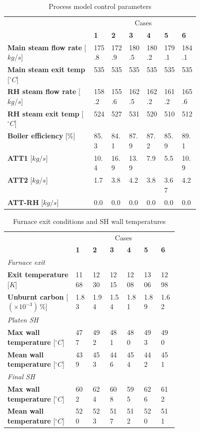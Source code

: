 \documentclass[review]{elsarticle}
\begin{document}
\begin{table}[h!]\label{tbl_process_parameters}
\centering
\caption{Process model control parameters}
\label{fuel}
{\tabulinesep=1.2mm
\begin{tabularx}{\linewidth}{p{0.45\linewidth} XXXXXX}
\hline
&\multicolumn{6}{c}{Cases}\\
 & \textbf{1} & \textbf{2} & \textbf{3}& \textbf{4}&\textbf{5}&\textbf{6}\\
\hline
\textbf{Main steam flow rate} 	[$kg/s$]		&175.8&172.9&180.5&180.2&179.1&184.1 \\
\textbf{Main steam exit temp} 	[$^{\circ}C$]	&535& 535 &535&535 &535& 535\\
\textbf{RH steam flow rate} 	[$kg/s$]		&158.2&155.6&162.5&162.2&161.2&165.6\\
\textbf{RH steam exit temp} 	[$^{\circ}C$]	&524&527&531&520&510&512\\
\textbf{Boiler efficiency} 		[$\%$]			&85.3&84.1&87.9	&87.2&85.9&89.1\\
\textbf{ATT1} 		[$kg/s$]					&10.4&16.9&13.9&7.9&5.5&10.9\\
\textbf{ATT2} 		[$kg/s$]					&1.7&3.8&4.2&3.8&3.67&4.2\\
\textbf{ATT-RH} 		[$kg/s$]				&0.0&0.0&0.0&0.0&0.0&0.0\\
\hline
\end{tabularx}}
\end{table}

\begin{table}[h!]\label{tbl_cfd_results}
\centering
\caption{Furnace exit conditions and SH wall temperatures}
\label{fuel}
{\tabulinesep=1.2mm
\begin{tabularx}{\linewidth}{p{0.4\linewidth} XXXXXX}
\hline
&\multicolumn{6}{c}{Cases}\\
 & \textbf{1} & \textbf{2} & \textbf{3}& \textbf{4}&\textbf{5}&\textbf{6}\\
\hline
\multicolumn{7}{l}{\textit{Furnace exit}}\\
\textbf{Exit temperature} [$K$] & 1168 & 1230 & 1215 & 1208 & 1306 & 1298\\
\textbf{Unburnt carbon} [$(\times 10^{-3})\,\%$] & 1.83 & 1.94 & 1.54 & 1.81 & 1.89 & 1.62\\
\multicolumn{7}{l}{\textit{Platen SH}}\\
\textbf{Max wall temperature} [$^{\circ}C$]  &477 & 492 & 481  & 480 & 493 & 490\\
\textbf{Mean wall temperature} [$^{\circ}C$] &439 & 453 & 446 & 454 & 442 & 451\\
\multicolumn{7}{l}{\textit{Final SH}}\\
\textbf{Max wall temperature} [$^{\circ}C$]  & 602 & 624 & 608 & 595 & 626 & 612\\
\textbf{Mean wall temperature} [$^{\circ}C$] & 520 & 523 & 517 & 512 & 520 & 511\\
\hline
\end{tabularx}}
\end{table}
\end{document}
